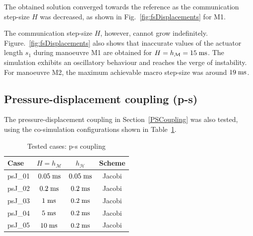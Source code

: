 \documentclass[fleqn,11pt]{article}
\renewcommand{\arraystretch}{1.136}
\newcommand{\unit}[1]		{ {\; \rm #1} }
\newcommand{\hM}    	{ h_{\mathcal{M}} }
\newcommand{\hH}     	{ h_{\mathcal{H}} }
\begin{document}
The obtained solution converged towards the reference as the communication step-size $H$ was decreased, as shown in Fig.~\ref{fig:fsDisplacements} for M1.

The communication step-size $H$, however, cannot grow indefinitely.
Figure.~\ref{fig:fsDisplacements} also shows that inaccurate values of the actuator length $s_1$ during manoeuvre M1 are obtained for $H=\hM=15\unit{ms}$.
The simulation exhibits an oscillatory behaviour and reaches the verge of instability.
For manoeuvre M2, the maximum achievable macro step-size was around $19\unit{ms}$.


\subsection{Pressure-displacement coupling (p-s)}
\label{PSCouplingResults}

The pressure-displacement coupling in Section~\ref{PSCoupling} was also tested, using the co-simulation configurations shown in Table~\ref{tab:psCouplingResults}.

\begin{table}[ht]
\begin{center}
{
	\renewcommand{\arraystretch}{1.25}
	\begin{tabular}{lccc}
		\hline
		Case  	& $H = \hM$ 		& $\hH$ 			& Scheme \\
		\hline
		psJ\_01 & $0.05\unit{ms}$ 	& $0.05\unit{ms}$ 	& Jacobi \\
		psJ\_02 & $0.2\unit{ms}$ 	& $0.2\unit{ms}$ 	& Jacobi \\
		psJ\_03 & $1\unit{ms}$ 		& $0.2\unit{ms}$ 	& Jacobi \\
		psJ\_04 & $5\unit{ms}$ 		& $0.2\unit{ms}$ 	& Jacobi \\
		psJ\_05 & $10\unit{ms}$ 	& $0.2\unit{ms}$ 	& Jacobi \\
		\hline
	\end{tabular}
}
\end{center}
\caption{Tested cases: p-s coupling}
\label{tab:psCouplingResults}
\end{table}
\end{document}

